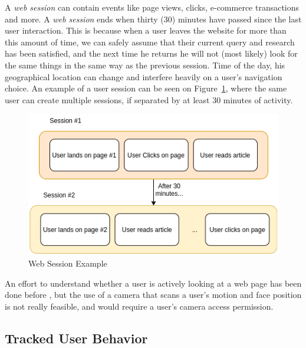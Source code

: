 \documentclass[sigconf,nonacm]{acmart}
\begin{document}
A \textit{web session} can contain events like page views, clicks, e-commerce
transactions and more. A \textit{web session} ends when thirty (30) minutes have
passed since the last user interaction. This is because when a user leaves the website for more than this amount of time,
we can safely assume that their current query and research has been satisfied,
and the next time he returns he will not (most likely) look for the same things
in the same way as the previous session. Time of the day, his geographical
location can change and interfere heavily on a user's navigation choice. An
example of a user session can be seen on Figure~\ref{fig:web-session-example},
where the same user can create multiple sessions, if separated by at least 30
minutes of activity.

\begin{figure}[h]
  \centering
  \includegraphics[width=\linewidth]{session-example.png}
  \caption{Web Session Example}
  \label{fig:web-session-example}
\end{figure}

An effort to understand whether a user is actively looking at a web page
has been done before \cite{kim2005implicit}, but the use of a camera that scans
a user's motion and face position is not really feasible, and would require a
user's camera access permission.

\subsection{Tracked User Behavior}
\end{document}
